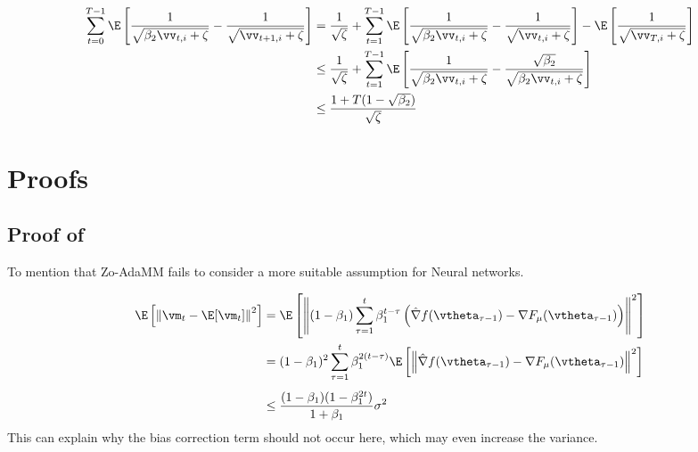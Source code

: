 \begin{equation}
\begin{aligned}
\sum_{t=0}^{T-1} \E\left[\frac{1}{\sqrt{\beta_2\vv_{t,i}+\zeta}} - \frac{1}{\sqrt{\vv_{t+1,i}+\zeta}} \right] &= \frac{1}{\sqrt{\zeta}} + \sum_{t=1}^{T-1}\E\left[\frac{1}{\sqrt{\beta_2\vv_{t,i} + \zeta}} - \frac{1}{\sqrt{\vv_{t,i} + \zeta}}\right] - \E\left[\frac{1}{\sqrt{\vv_{T,i} + \zeta}}\right] \\
&\leq \frac{1}{\sqrt{\zeta}} + \sum_{t=1}^{T-1}\E\left[\frac{1}{\sqrt{\beta_2\vv_{t,i} + \zeta}} - \frac{\sqrt{\beta_2}}{\sqrt{\beta_2\vv_{t,i} + \zeta}}\right] \\
&\leq \frac{1 + T(1-\sqrt{\beta_2})}{\sqrt{\zeta}}
\end{aligned}
\end{equation} 

\section{Proofs}
\subsection{Proof of}

To mention that Zo-AdaMM fails to consider a more suitable assumption for Neural networks.


\begin{equation}
\begin{aligned}
\E\left[\left\|\vm_t - \E[\vm_t]\right\|^2\right] &= \E\left[\left\|(1-\beta_1)\sum_{\tau=1}^{t}\beta_1^{t-\tau}\left(\hat{\nabla} f(\vtheta_{\tau-1}) - \nabla F_{\mu}(\vtheta_{\tau-1})\right)\right\|^2\right] \\
&= (1-\beta_1)^2\sum_{\tau=1}^{t}\beta_1^{2(t-\tau)}\E\left[\left\|\hat{\nabla} f(\vtheta_{\tau-1}) - \nabla F_{\mu}(\vtheta_{\tau-1})\right\|^2\right] \\[4pt]
&\leq \frac{(1-\beta_1)(1-\beta_1^{2t})}{1 + \beta_1} \sigma^2
\end{aligned}
\end{equation}
This can explain why the bias correction term should not occur here, which may even increase the variance.

